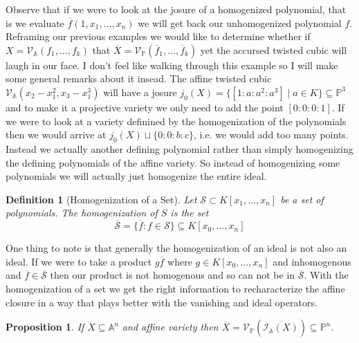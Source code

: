 \documentclass[40pt]{article}
\newtheorem{definition}{Definition}[section]
\newcommand{\mcal}[1]{\mathcal{#1}}
\newcommand{\Proj}{\mathbb{P}}
\newcommand{\A}{\mathbb{A}}
\newcommand{\I}{\mathcal{I}}
\newcommand{\V}{\mathcal{V}}
\newtheorem{proposition}{Proposition}[section]
\theoremstyle{remark}
\begin{document}
		Observe that if we were to look at the josure of a homogenized polynomial, that is we evaluate $\overline f(1,x_1,\dots,x_n)$ we will get back our unhomogenized polynomial $f$. Reframing our previous examples we would like to determine whether if $X = \V_\A(f_1,\dots,f_k)$ that $\overline X = \V_\Proj(\overline f_1, \dots, \overline f_k)$ yet the accursed twisted cubic will laugh in our face. I don't feel like walking through this example so I will make some general remarks about it insead. The affine twisted cubic $\V_\A(x_2-x_1^2, x_3-x_1^3)$ will have a josure $j_0(X) = \{[1:a:a^2:a^3] \; | \; a \in K\} \subseteq \Proj^3$ and to make it a projective variety we only need to add the point $[0:0:0:1]$. If we were to look at a variety definined by the homogenization of the polynomials then we would arrive at $j_0(X) \sqcup \{0:0:b:c\}$, i.e. we would add too many points. Instead we actually another defining polynomial rather than simply homogenizing the defining polynomials of the affine variety. So instead of homogenizing some polynomials we will actually just homogenize the entire ideal.
		\begin{definition}[Homogenization of a Set]
			Let $\mcal{S} \subset K[x_1,\dots,x_n]$ be a set of polynomials. The homogenization of $S$ is the set
			\[ \overline{ \mcal{S}} = \{\overline f : f \in \mcal{S}\} \subseteq K[x_0,\dots,x_n]\]
		\end{definition}
		One thing to note is that generally the homogenization of an ideal is not also an ideal. If we were to take a product $g \overline f$ where $g \in K[x_0,\dots,x_n]$ and inhomogenous and $\overline f \in \overline{\mcal{S}}$ then our product is not homogenous and so can not be in $\overline{\mcal{S}}$. With the homogenization of a set we get the right information to recharacterize the affine closure in a way that plays better with the vanishing and ideal operators. 
		\begin{proposition}
			If $X \subseteq \A^n$ and affine variety then $\overline X = \V_\Proj(\overline{\I_\A(X)}) \subseteq \Proj^n$. 
		\end{proposition}
\end{document}
